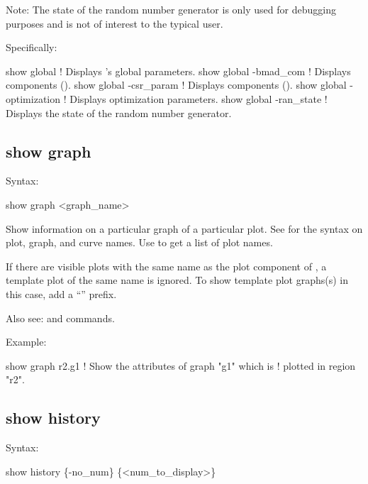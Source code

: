 {{{{{{{{Note: The state of the random number generator is only used for debugging purposes and is not of
interest to the typical user.

Specifically:
\begin{example}
  show global               ! Displays \tao's global parameters.
  show global -bmad_com     ! Displays  components ().
  show global -csr_param    ! Displays  components ().
  show global -optimization ! Displays optimization parameters.
  show global -ran_state    ! Displays the state of the random number generator.
\end{example}


\subsection{show graph}
\label{s:show.graph}

Syntax:
\begin{example}
  show graph <graph_name>
\end{example}

Show information on a particular graph of a particular plot. See  for the
syntax on plot, graph, and curve names.  Use  to get a list of plot names.

If there are visible plots with the same name as the plot component of , a
template plot of the same name is ignored. To show template plot graphs(s) in this case, add a
``'' prefix.

Also see:  and  commands.

Example:
\begin{example}
  show graph r2.g1         ! Show the attributes of graph "g1" which is 
                           !   plotted in region "r2".
\end{example}


\subsection{show history}
\label{s:show.history}

Syntax:
\begin{example}
  show history \{-no_num\} \{<num_to_display>\}
\end{example}

}}}}}}}}
